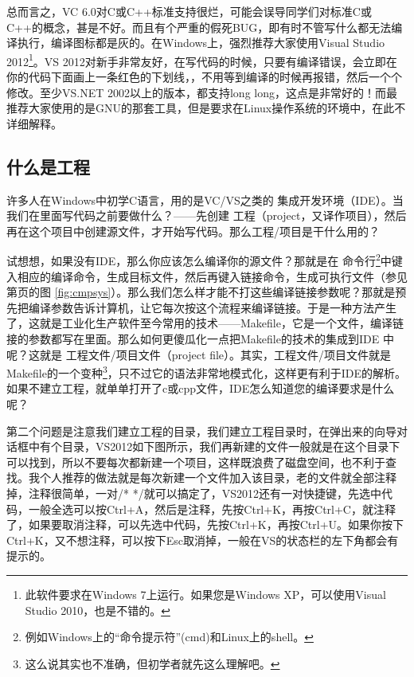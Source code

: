 \documentclass[11pt,twoside,a4paper,titlepage]{article}	%
\newcommand{\kw}[1]{\textcolor[rgb]{0.0,0.0,0.63}{ #1}}
\begin{document}
总而言之，VC 6.0对C或C++标准支持很烂，可能会误导同学们对标准C或C++的概念，甚是不好。而且有个严重的假死BUG，即有时不管写什么都无法编译执行，编译图标都是灰的。在Windows上，强烈推荐大家使用Visual Studio 2012\footnote{此软件要求在Windows 7上运行。如果您是Windows XP，可以使用Visual Studio 2010，也是不错的。}。VS 2012对新手非常友好，在写代码的时候，只要有编译错误，会立即在你的代码下面画上一条红色的下划线，{\color{red}{\uwave{\color{black}{就}}}}{\color{red}{\uwave{\color{black}{像}}}}{\color{red}{\uwave{\color{black}{这}}}}{\color{red}{\uwave{\color{black}{样}}}}，不用等到编译的时候再报错，然后一个个修改。至少VS.NET 2002以上的版本，都支持long long，这点是非常好的！而最推荐大家使用的是GNU的那套工具，但是要求在Linux操作系统的环境中，在此不详细解释。

\subsection{什么是工程}
许多人在Windows中初学C语言，用的是VC/VS之类的\kw{集成开发环境（IDE）}。当我们在里面写代码之前要做什么？——先创建\kw{工程（project，又译作项目）}，然后再在这个项目中创建源文件，才开始写代码。那么工程/项目是干什么用的？

试想想，如果没有IDE，那么你应该怎么编译你的源文件？那就是在\kw{命令行}\footnote{例如Windows上的“命令提示符”(cmd)和Linux上的shell。}中键入相应的编译命令，生成目标文件，然后再键入链接命令，生成可执行文件（参见第\pageref{fig:cmpsys}页的图 \ref{fig:cmpsys}）。那么我们怎么样才能不打这些编译链接参数呢？那就是预先把编译参数告诉计算机，让它每次按这个流程来编译链接。于是一种方法产生了，这就是工业化生产软件至今常用的技术——Makefile，它是一个文件，编译链接的参数都写在里面。那么如何更傻瓜化一点把Makefile的技术的集成到IDE 中呢？这就是\kw{工程文件/项目文件（project file）}。其实，工程文件/项目文件就是Makefile的一个变种\footnote{这么说其实也不准确，但初学者就先这么理解吧。}，只不过它的语法非常地模式化，这样更有利于IDE的解析。如果不建立工程，就单单打开了c或cpp文件，IDE怎么知道您的编译要求是什么呢？

第二个问题是注意我们建立工程的目录，我们建立工程目录时，在弹出来的向导对话框中有个目录，VS2012如下图所示，我们再新建的文件一般就是在这个目录下可以找到，所以不要每次都新建一个项目，这样既浪费了磁盘空间，也不利于查找。我个人推荐的做法就是每次新建一个文件加入该目录，老的文件就全部注释掉，注释很简单，一对/* */就可以搞定了，VS2012还有一对快捷键，先选中代码，一般全选可以按Ctrl+A，然后是注释，先按Ctrl+K，再按Ctrl+C，就注释了，如果要取消注释，可以先选中代码，先按Ctrl+K，再按Ctrl+U。如果你按下Ctrl+K，又不想注释，可以按下Esc取消掉，一般在VS的状态栏的左下角都会有提示的。
\end{document}

